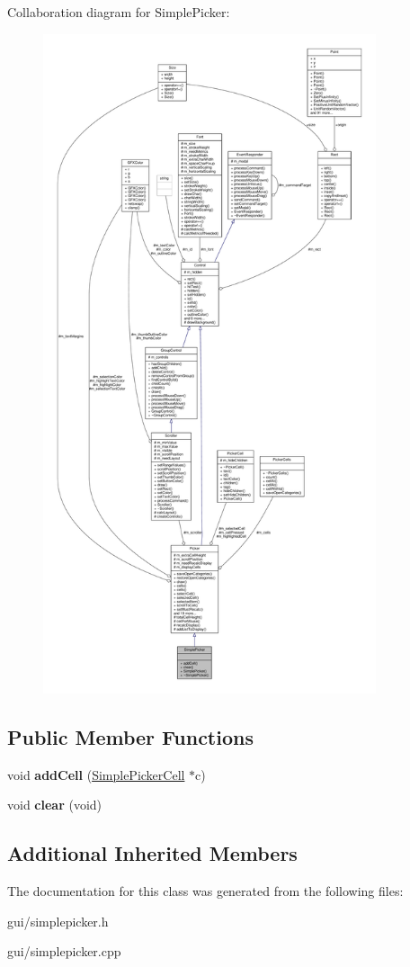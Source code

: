 Collaboration diagram for Simple\+Picker\+:
\nopagebreak
\begin{figure}[H]
\begin{center}
\leavevmode
\includegraphics[height=550pt]{da/dd3/classSimplePicker__coll__graph}
\end{center}
\end{figure}
\subsection*{Public Member Functions}
\begin{DoxyCompactItemize}
\item 
void {\bfseries add\+Cell} (\hyperlink{classSimplePickerCell}{Simple\+Picker\+Cell} $\ast$c)\hypertarget{classSimplePicker_ad85e68d8f5c674281fb82bb66ffd751d}{}\label{classSimplePicker_ad85e68d8f5c674281fb82bb66ffd751d}

\item 
void {\bfseries clear} (void)\hypertarget{classSimplePicker_aa671f563a69b9ae40309af1f781b888c}{}\label{classSimplePicker_aa671f563a69b9ae40309af1f781b888c}

\end{DoxyCompactItemize}
\subsection*{Additional Inherited Members}


The documentation for this class was generated from the following files\+:\begin{DoxyCompactItemize}
\item 
gui/simplepicker.\+h\item 
gui/simplepicker.\+cpp\end{DoxyCompactItemize}
